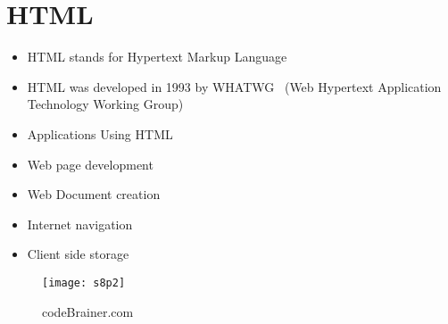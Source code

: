 \documentclass{article}
\begin{document}
	\section{HTML}
	\begin{itemize}
		\item HTML stands for Hypertext Markup Language
		\item HTML was developed in 1993 by WHATWG  (Web Hypertext Application Technology Working Group)
		\item Applications Using HTML
		\item Web page development
		\item Web Document creation
		\item Internet navigation
		\item Client side storage
	\end{itemize}
\begin{figure}
	\texttt{[image: s8p2]}
	\caption{codeBrainer.com}
	\label{fig:s8p2}
\end{figure}
\end{document}
